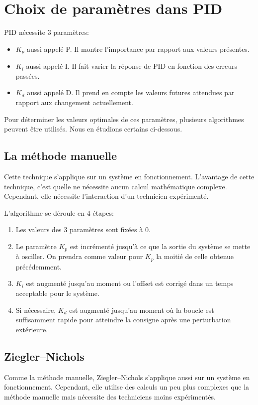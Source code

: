 \section{Choix de paramètres dans PID}
PID nécessite 3 paramètres:
\begin{itemize}
	\item $K_p$ aussi appelé P. Il montre l'importance par rapport aux valeurs présentes.
	\item $K_i$ aussi appelé I. Il fait varier la réponse de PID en fonction des erreurs passées.
	\item $K_d$ aussi appelé D. Il prend en compte les valeurs futures attendues par rapport aux changement actuellement.
\end{itemize}

Pour déterminer les valeurs optimales de ces paramètres, plusieurs algorithmes peuvent être utilisés. Nous en étudions certains ci-dessous.

\subsection{La méthode manuelle}
Cette technique s'applique sur un système en fonctionnement.
L'avantage de cette technique, c'est quelle ne nécessite aucun calcul mathématique complexe.
Cependant, elle nécessite l'interaction d'un technicien expérimenté.

L'algorithme se déroule en 4 étapes:
\begin{enumerate}
	\item Les valeurs des 3 paramètres sont fixées à $0$.
	\item Le paramètre $K_p$ est incrémenté jusqu'à ce que la sortie du système se mette à osciller.
	On prendra comme valeur pour $K_p$ la moitié de celle obtenue précédemment.
	\item $K_i$ est augmenté jusqu'au moment ou l'offset est corrigé dans un temps acceptable pour le système.
	\item Si nécessaire, $K_d$ est augmenté jusqu'au moment où la boucle est suffisamment rapide pour atteindre la consigne après une perturbation extérieure.
\end{enumerate}

\subsection{Ziegler–Nichols}
Comme la méthode manuelle, Ziegler–Nichols s'applique aussi sur un système en fonctionnement. Cependant, elle utilise des calculs un peu plus complexes que la méthode manuelle mais nécessite des techniciens moins expérimentés.

